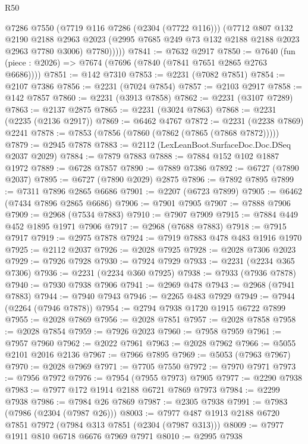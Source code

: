 \begin{lexlean}{R50}
\begin{coremodule}
            @7286
            @7550
            (@7719 @116 @7286 (@2304 (@7722 @116)))
            (@7712
              @807
              @132
              @2190
              @2188
              @2963
              @2023
              (@2995 @7685 @249 @73 @132 @2188 @2188 @2023 @2963 @7780 @3006)
              @7780)))))
@7841 := @7632 @2917
@7850 := @7640 (fun (piece : @2026) => @7674 (@7696 (@7840 (@7841 @7651 @2865 @2763 @6686))))
@7851 := @142 @7310
@7853 := @2231 (@7082 @7851)
@7854 := @2107 @7386
@7856 := @2231 (@7024 @7854)
@7857 := @2103 @2917
@7858 := @142 @7857
@7860 := @2231 (@3913 @7858)
@7862 := @2231 (@3107 @7289)
@7863 := @2137 @2875
@7865 := @2231 (@3024 @7863)
@7868 := @2231 (@2235 (@2136 @2917))
@7869 := @6462 @4767
@7872 := @2231 (@2238 @7869) @2241
@7878 := @7853 (@7856 (@7860 (@7862 (@7865 (@7868 @7872)))))
@7879 := @2945 @7878
@7883 := @2112 (LexLeanBoot.SurfaceDoc.Doc.DSeq @2037 @2029)
@7884 := @7879 @7883
@7888 := @7884 @152 @102 @1887 @1972
@7889 := @6728 @7857
@7890 := @7889 @7386
@7892 := @6727 (@7890 @2037)
@7895 := @6727 (@7890 @2029) @2875
@7896 := @7892 @7895
@7899 := @7311 @7896 @2865 @6686
@7901 := @2207 (@6723 @7899)
@7905 := @6462 (@7434 @7896 @2865 @6686)
@7906 := @7901 @7905
@7907 := @7888 @7906
@7909 := @2968 (@7534 @7883)
@7910 := @7907 @7909
@7915 := @7884 @449 @452 @1895 @1971 @7906
@7917 := @2968 (@7688 @7883)
@7918 := @7915 @7917
@7919 := @2975 @7878
@7924 := @7919 @7883 @478 @483 @1916 @1970
@7925 := @2112 @2037
@7926 := @2028 @7925
@7928 := @2028 @7306 @2023
@7929 := @7926 @7928
@7930 := @7924 @7929
@7933 := @2231 (@2234 @365 @7306)
@7936 := @2231 (@2234 @360 @7925)
@7938 := @7933 (@7936 @7878)
@7940 := @7930 @7938 @7906
@7941 := @2969 @478
@7943 := @2968 (@7941 @7883)
@7944 := @7940 @7943
@7946 := @2265 @483 @7929
@7949 := @7944 (@2264 (@7946 @7878))
@7954 := @2794 @7938 @1720 @1915 @6722 @7899
@7955 := @2028 @7869
@7956 := @2028 @7851
@7957 := @2028 @7858
@7958 := @2028 @7854
@7959 := @7926 @2023
@7960 := @7958 @7959
@7961 := @7957 @7960
@7962 := @2022 @7961
@7963 := @2028 @7962
@7966 := @5055 @2101 @2016 @2136
@7967 := @7966 @7895
@7969 := @5053 (@7963 @7967)
@7970 := @2028 @7969
@7971 := @7705 @7550
@7972 := @7970 @7971
@7973 := @7956 @7972
@7976 := @7954 (@7955 @7973) @7905
@7977 := @2290 @7938
@7983 := @7977 @172 @1914 @2188 @6721 @7869 @7973
@7984 := @2299 @7938
@7986 := @7984 @26 @7869
@7987 := @2305 @7938
@7991 := @7983 (@7986 (@2304 (@7987 @26)))
@8003 := @7977 @487 @1913 @2188 @6720 @7851 @7972 (@7984 @313 @7851 (@2304 (@7987 @313)))
@8009 := @7977 @1911 @810 @6718 @6676 @7969 @7971
@8010 := @2995 @7938

\end{coremodule}
\end{lexlean}
